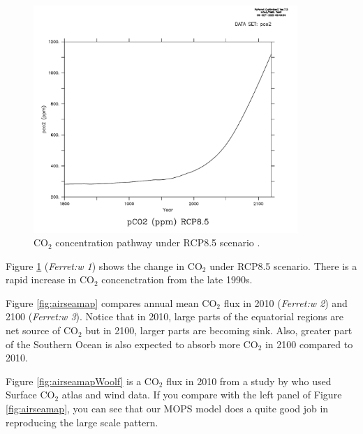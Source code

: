 \documentclass[a4paper]{article}
\def\CO{$\mathrm{CO_{2}}$ }
\begin{document}
\begin{enumerate}
\begin{figure}[H]   %
   \centering
   \includegraphics[width=10cm]{pco2RCP85.pdf}
   \caption[]{$\mathrm{CO_2}$ concentration pathway under RCP8.5 scenario \citep{Meinshausen11}.}
   \label{fig:pco2RCP85}
\end{figure}

Figure \ref{fig:pco2RCP85} (\emph{Ferret:w 1}) shows the change in $\mathrm{CO_2}$ under RCP8.5 scenario. There is a rapid increase in \CO concenctration from the late 1990s. 

Figure \ref{fig:airseamap} compares annual mean $\mathrm{CO_2}$ flux in 2010 (\emph{Ferret:w 2}) and 2100 (\emph{Ferret:w 3}). Notice that in 2010, large parts of the equatorial regions are net source of $\mathrm{CO_2}$ but in 2100, larger parts are becoming sink. Also, greater part of the Southern Ocean is also expected to absorb more  $\mathrm{CO_2}$ in 2100 compared to 2010. 

Figure \ref{fig:airseamapWoolf} is a $\mathrm{CO_2}$ flux in 2010 from a study by \cite{Woolf19} who used Surface $\mathrm{CO_2}$ atlas and wind data. If you compare with the left panel of Figure  \ref{fig:airseamap}, you can see that our MOPS model does a quite good job in reproducing the large scale pattern.


\end{enumerate}
\end{document}
